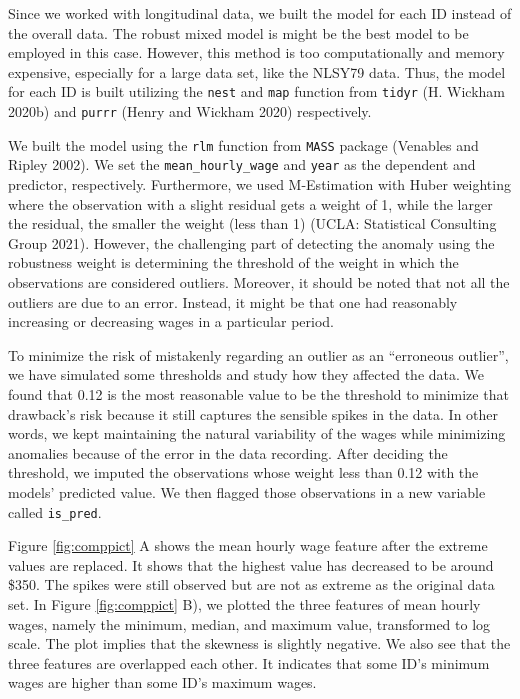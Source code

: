 \documentclass{article}
\begin{document}
Since we worked with longitudinal data, we built the model for each ID instead of the overall data. The robust mixed model is might be the best model to be employed in this case. However, this method is too computationally and memory expensive, especially for a large data set, like the NLSY79 data. Thus, the model for each ID is built utilizing the \texttt{nest} and \texttt{map} function from \texttt{tidyr} (H. Wickham 2020b) and \texttt{purrr} (Henry and Wickham 2020) respectively.

We built the model using the \texttt{rlm} function from \texttt{MASS} package (Venables and Ripley 2002). We set the \texttt{mean\_hourly\_wage} and \texttt{year} as the dependent and predictor, respectively. Furthermore, we used M-Estimation with Huber weighting where the observation with a slight residual gets a weight of 1, while the larger the residual, the smaller the weight (less than 1) (UCLA: Statistical Consulting Group 2021). However, the challenging part of detecting the anomaly using the robustness weight is determining the threshold of the weight in which the observations are considered outliers. Moreover, it should be noted that not all the outliers are due to an error. Instead, it might be that one had reasonably increasing or decreasing wages in a particular period.

To minimize the risk of mistakenly regarding an outlier as an ``erroneous outlier'', we have simulated some thresholds and study how they affected the data. We found that 0.12 is the most reasonable value to be the threshold to minimize that drawback's risk because it still captures the sensible spikes in the data. In other words, we kept maintaining the natural variability of the wages while minimizing anomalies because of the error in the data recording. After deciding the threshold, we imputed the observations whose weight less than 0.12 with the models' predicted value. We then flagged those observations in a new variable called \texttt{is\_pred}.

Figure \ref{fig:comppict} A shows the mean hourly wage feature after the extreme values are replaced. It shows that the highest value has decreased to be around \$350. The spikes were still observed but are not as extreme as the original data set. In Figure \ref{fig:comppict} B), we plotted the three features of mean hourly wages, namely the minimum, median, and maximum value, transformed to log scale. The plot implies that the skewness is slightly negative. We also see that the three features are overlapped each other. It indicates that some ID's minimum wages are higher than some ID's maximum wages.
\end{document}
